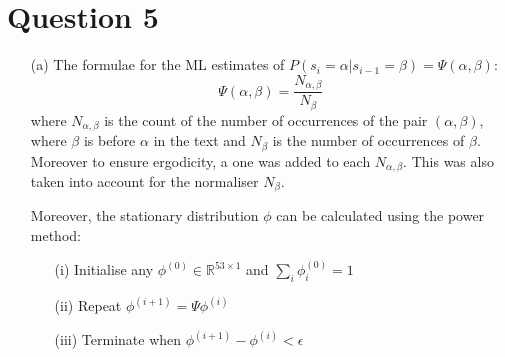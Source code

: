 \documentclass[12pt]{article}
\begin{document}
\newpage
\section*{Question 5}

\begin{enumerate}

%
%
%
%


\item[(a)] The formulae for the ML estimates of $P(s_i = \alpha |s_{i-1} = \beta) = \Psi(\alpha, \beta)$:
$$\Psi(\alpha, \beta) = \frac{N_{\alpha, \beta}}{N_{\beta}}$$
where $N_{\alpha, \beta}$ is the count of the number of occurrences of the pair $(\alpha, \beta)$, where $\beta$ is before $\alpha$ in the text and $N_{\beta}$ is the number of occurrences of $\beta$. Moreover to ensure ergodicity, a one was added to each $N_{\alpha, \beta}$. This was also taken into account for the normaliser $N_{\beta}$.

Moreover, the stationary distribution $\phi$ can be calculated using the power method:
\begin{enumerate}
  \item[(i)] Initialise any $\phi^{(0)} \in \mathbb{R}^{53 \times 1}$ and $\sum_i \phi^{(0)}_i = 1$
  \item[(ii)] Repeat $\phi^{(i+1)} = \Psi \phi^{(i)}$
  \item[(iii)] Terminate when $\phi^{(i+1)} - \phi^{(i)} < \epsilon$
\end{enumerate}


\end{enumerate}
\end{document}
